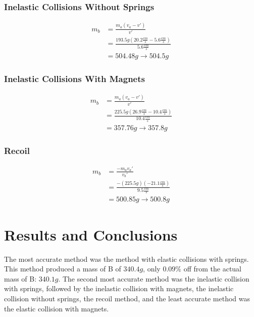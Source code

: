 \documentclass[12pt]{article}
\begin{document}
\subsubsection{Inelastic Collisions Without Springs}
\begin{equation}
    \begin{aligned}
        m_b&=\frac{m_a(v_a-v')}{v'} \\
        &=\frac{193.5g(20.2\frac{cm}{s}-5.6\frac{cm}{s})}{5.6\frac{cm}{s}} \\
        &=504.48g\rightarrow504.5g
    \end{aligned}
\end{equation}
\subsubsection{Inelastic Collisions With Magnets}
\begin{equation}
    \begin{aligned}
        m_b&=\frac{m_a(v_a-v')}{v'} \\
        &=\frac{225.5g(26.9\frac{cm}{s}-10.4\frac{cm}{s})}{10.4\frac{cm}{s}} \\
        &=357.76g\rightarrow357.8g
    \end{aligned}
\end{equation}
\subsubsection{Recoil}
\begin{equation}
    \begin{aligned}
        m_b&=\frac{-m_av_a'}{v_b'} \\
        &=\frac{-(225.5g)(-21.1\frac{cm}{s})}{9.5\frac{cm}{s}} \\
        &=500.85g\rightarrow500.8g
    \end{aligned}
\end{equation}

\newpage
\section{Results and Conclusions}
The most accurate method was the method with elastic collisions with springs. This method produced a mass of B of $340.4g$, only $0.09\%$ off from the actual mass of B: $340.1g$. The second most accurate method was the inelastic collision with springs, followed by the inelastic collision with magnets, the inelastic collision without springs, the recoil method, and the least accurate method was the elastic collision with magnets.
\end{document}
